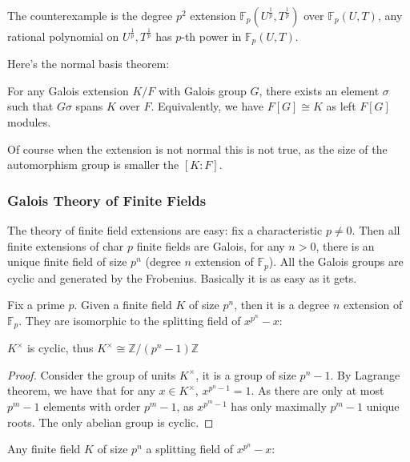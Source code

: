 \documentclass[main.tex]{subfiles}
\begin{document}
\begin{remark}
The counterexample is the degree $p^2$ extension $\mathbb{F}_p(U^\frac{1}{p}, T^\frac{1}{p})$ over $\mathbb{F}_p(U,T)$, any rational polynomial on $U^\frac{1}{p}, T^\frac{1}{p}$ has $p$-th power in $\mathbb{F}_p(U,T)$.
\end{remark}

Here's the normal basis theorem:
\begin{theorem}
For any Galois extension $K/F$ with Galois group $G$, there exists an element $\sigma$ such that $G \sigma$ spans $K$ over $F$. Equivalently, we have $F[G] \cong K$ as left $F[G]$ modules. 
\end{theorem}

\begin{remark}
Of course when the extension is not normal this is not true, as the size of the automorphism group is smaller the $[K:F]$.
\end{remark}

\subsubsection{Galois Theory of Finite Fields}

The theory of finite field extensions are easy: fix a characteristic $p \neq 0$. Then all finite extensions of char $p$ finite fields are Galois, for any $n > 0$, there is an unique finite field of size $p^n$ (degree $n$ extension of $\mathbb{F}_p$). All the Galois groups are cyclic and generated by the Frobenius. Basically it is as easy as it gets.

Fix a prime $p$. Given a finite field $K$ of size $p^n$, then it is a degree $n$ extension of $\mathbb{F}_p$. They are isomorphic to the splitting field of $x^{p^n} - x$:

\begin{lemma}
$K^\times$ is cyclic, thus $K^\times \cong \mathbb{Z}/(p^n - 1)\mathbb{Z} $
\end{lemma}

\begin{proof}
Consider the group of units $K^\times$, it is a group of size $p^n -1$. By Lagrange theorem, we have that for any $x \in K^\times$, $x^{p^n -1} = 1$. As there are only at most $p^m-1$ elements with order $p^m-1$, as $x^{p^m -1}$ has only maximally $p^m -1$ unique roots. The only abelian group is cyclic.
\end{proof}


\begin{lemma}
Any finite field $K$ of size $p^n$ a splitting field of $x^{p^n} -x$:
\end{lemma}
\end{document}
